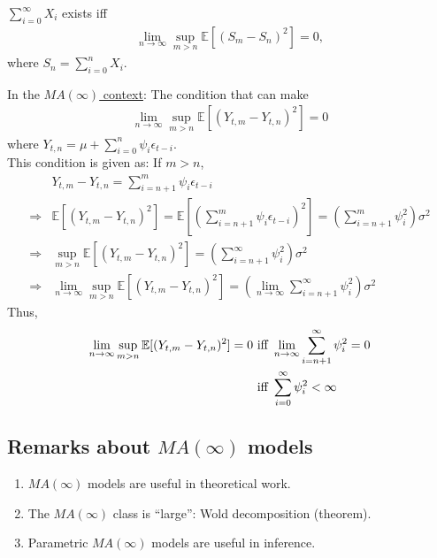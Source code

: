 \documentclass[11pt]{elegantbook}
\begin{document}
\begin{theorem}
    $\sum_{i=0}^\infty X_i$ exists iff
    \begin{equation}
        \begin{aligned}
            \lim_{n \rightarrow \infty}\sup_{m>n}\mathbb{E}[(S_m-S_n)^2]=0,
        \end{aligned}
        \nonumber
    \end{equation}
    where $S_n=\sum_{i=0}^n X_i$.
\end{theorem}
In the \underline{$MA(\infty)$ context}: The condition that can make
\begin{equation}
    \begin{aligned}
        \lim_{n \rightarrow \infty}\sup_{m>n}\mathbb{E}[(Y_{t,m}-Y_{t,n})^2]=0
    \end{aligned}
    \nonumber
\end{equation}
where $Y_{t,n}=\mu+\sum_{i=0}^n\psi_i\epsilon_{t-i}$.\\
This condition is given as: If $m>n$,
\begin{equation}
    \begin{aligned}
        &Y_{t,m}-Y_{t,n}=\sum_{i=n+1}^m\psi_i\epsilon_{t-i}\\
        \Rightarrow & \mathbb{E}[(Y_{t,m}-Y_{t,n})^2]=\mathbb{E}\left[\left(\sum_{i=n+1}^m\psi_i\epsilon_{t-i}\right)^2\right]=\left(\sum_{i=n+1}^m\psi_i^2\right)\sigma^2\\
        \Rightarrow & \sup_{m>n}\mathbb{E}[(Y_{t,m}-Y_{t,n})^2]=\left(\sum_{i=n+1}^\infty\psi_i^2\right)\sigma^2\\
        \Rightarrow & \lim_{n \rightarrow \infty}\sup_{m>n}\mathbb{E}[(Y_{t,m}-Y_{t,n})^2]=\left(\lim_{n \rightarrow \infty}\sum_{i=n+1}^\infty\psi_i^2\right)\sigma^2
    \end{aligned}
    \nonumber
\end{equation}
Thus,
\begin{equation}
    \begin{aligned}
        \lim_{n \rightarrow \infty}\sup_{m>n}\mathbb{E}[(Y_{t,m}-Y_{t,n})^2]=0 &\textnormal{ iff }\lim_{n \rightarrow \infty}\sum_{i=n+1}^\infty\psi_i^2=0\\
        &\textnormal{ iff }\sum_{i=0}^\infty\psi_i^2<\infty
    \end{aligned}
    \nonumber
\end{equation}


\subsection{Remarks about $MA(\infty)$ models}
\begin{enumerate}
    \item $MA(\infty)$ models are useful in theoretical work.
    \item The $MA(\infty)$ class is ``large'': Wold decomposition (theorem).
    \item Parametric $MA(\infty)$ models are useful in inference.
\end{enumerate}
\end{document}
